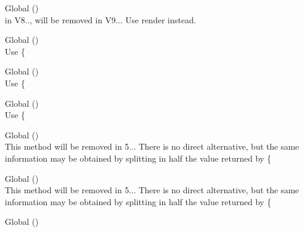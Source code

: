 \begin{DoxyRefList}
\item[Global \doxylink{class_sabberworm_1_1_c_s_s_1_1_c_s_s_list_1_1_key_frame_a7516ca30af0db3cdbf9a7739b48ce91d}{Key\+Frame\+::\+\_\+\+\_\+to\+String} ()]\hfill \\
\label{deprecated__deprecated000386}%
%
in V8.., will be removed in V9... Use {\ttfamily render} instead.  
\item[Global \doxylink{class_ramsey_1_1_uuid_1_1_lazy_1_1_lazy_uuid_from_string_a353dfd5c6c87ff413f6e82fe9a82eb70}{Lazy\+Uuid\+From\+String\+::get\+Clock\+Seq\+Hi\+And\+Reserved} ()]\hfill \\
\label{deprecated__deprecated000365}%
%
Use \{ 
\item[Global \doxylink{class_ramsey_1_1_uuid_1_1_lazy_1_1_lazy_uuid_from_string_a4b33ab021dedc57f5f05f9a89c050d6a}{Lazy\+Uuid\+From\+String\+::get\+Clock\+Seq\+Low} ()]\hfill \\
\label{deprecated__deprecated000366}%
%
Use \{ 
\item[Global \doxylink{class_ramsey_1_1_uuid_1_1_lazy_1_1_lazy_uuid_from_string_a69af002f4eae76e4b8ce2708237772e2}{Lazy\+Uuid\+From\+String\+::get\+Clock\+Sequence} ()]\hfill \\
\label{deprecated__deprecated000367}%
%
Use \{ 
\item[Global \doxylink{class_ramsey_1_1_uuid_1_1_lazy_1_1_lazy_uuid_from_string_ac390b06f87193c7e996214539492f874}{Lazy\+Uuid\+From\+String\+::get\+Least\+Significant\+Bits} ()]\hfill \\
\label{deprecated__deprecated000368}%
%
This method will be removed in 5... There is no direct alternative, but the same information may be obtained by splitting in half the value returned by \{ 
\item[Global \doxylink{class_ramsey_1_1_uuid_1_1_lazy_1_1_lazy_uuid_from_string_a0092bdbdf25e1daaf521df1787df0e40}{Lazy\+Uuid\+From\+String\+::get\+Most\+Significant\+Bits} ()]\hfill \\
\label{deprecated__deprecated000369}%
%
This method will be removed in 5... There is no direct alternative, but the same information may be obtained by splitting in half the value returned by \{ 
\item[Global \doxylink{class_ramsey_1_1_uuid_1_1_lazy_1_1_lazy_uuid_from_string_a3a0d17930cbcc57bef84064afcc1a837}{Lazy\+Uuid\+From\+String\+::get\+Node} ()]\hfill \\

\end{DoxyRefList}
